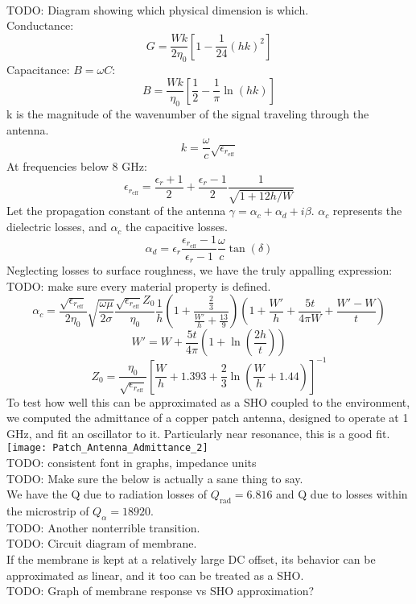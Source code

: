 \documentclass[final]{article}
\begin{document}
\\
TODO: Diagram showing which physical dimension is which.\\
Conductance:
\[G=\frac{Wk}{2\eta_0} \left[1-\frac{1}{24}\left(hk\right)^2\right]\]
Capacitance: \(B=\omega C\):
\[B=\frac{Wk}{\eta_0} \left[\frac{1}{2}-\frac{1}{\pi} \ln\left(hk\right)\right]\]
k is the magnitude of the wavenumber of the signal traveling through the antenna.
\[k=\frac{\omega}{c}\sqrt{\epsilon_{r_\text{eff}}}\]
At frequencies below 8 GHz:
\[\epsilon_{r_{\text{eff}}}=\frac{\epsilon_r+1}{2}+\frac{\epsilon_r-1}{2}\frac{1}{\sqrt{1+12h/W}}\]
Let the propagation constant of the antenna \(\gamma=\alpha_c+\alpha_d+i\beta\). \(\alpha_c\) represents the dielectric losses, and \(\alpha_c\) the capacitive losses.
\[\alpha_d= \epsilon_r \frac{\epsilon_{r_{\text{eff}}}-1}{\epsilon_r-1} \frac{\omega}{c} \tan(\delta)\]
Neglecting losses to surface roughness, we have the truly appalling expression:\\
TODO: make sure every material property is defined.
\[\alpha_c=\frac{\sqrt{\epsilon_{r_{\text{eff}}}}}{2\eta_0} \sqrt{\frac{\omega \mu}{2\sigma}} \frac{\sqrt{\epsilon_{r_{\text{eff}}}} Z_0}{\eta_0} \frac{1}{h}\left(1+\frac{\frac{2}{3}}{\frac{W'}{h}+\frac{13}{9}}\right)
\left(1+\frac{W'}{h}+\frac{5t}{4\pi W}+\frac{W'-W}{t}\right)\]
\[W'=W+\frac{5t}{4\pi}\left(1+\ln\left(\frac{2h}{t}\right)\right)\]
\[Z_0=\frac{\eta_0}{\sqrt{\epsilon_{r_{\text{eff}}}}}\left[\frac{W}{h}+1.393+\frac{2}{3}\ln\left(\frac{W}{h}+1.44\right)\right]^{-1}\]
To test how well this can be approximated as a SHO coupled to the environment, we computed the admittance of a copper patch antenna, designed to operate at 1 GHz, and fit an oscillator to it. Particularly near resonance, this is a good fit.\\
\texttt{[image: Patch\_Antenna\_Admittance\_2]}\\
TODO: consistent font in graphs, impedance units\\
TODO: Make sure the below is actually a sane thing to say.\\
We have the Q due to radiation losses of \(Q_{\text{rad}}=6.816\) and Q due to losses within the microstrip of \(Q_{\alpha}=18920\).\\
TODO: Another nonterrible transition.\\
TODO: Circuit diagram of membrane.\\
If the membrane is kept at a relatively large DC offset, its behavior can be approximated as linear, and it too can be treated as a SHO.\\
TODO: Graph of membrane response vs SHO approximation?
\end{document}
